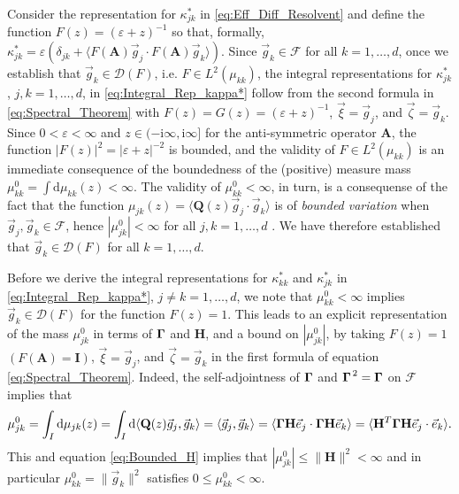 \documentclass[11pt]{amsart}
\newcommand{\I}{\mathrm{i}}
\renewcommand{\d}{\mathrm{d}}
\newcommand{\Hb}{\mathbf{H}}
\newcommand{\Ib}{\mathbf{I}}
\newcommand{\Ab}{\mathbf{A}}
\newcommand{\Qb}{\mathbf{Q}}
\newcommand{\Ds}{\mathscr{D}}
\newcommand{\Fs}{\mathscr{F}}
\newcommand\bGamma{\mbox{\boldmath${\Gamma}$}}
\begin{document}
Consider the representation for $\kappa^*_{jk}$ in
\eqref{eq:Eff_Diff_Resolvent} and define the function
$F(z)=(\varepsilon+z)^{-1}$ so that, formally,
$\kappa^*_{jk}=\varepsilon(\delta_{jk}+\langle F(\Ab)\vec{g}_j\cdot F(\Ab)\vec{g}_k\rangle)$. Since
$\vec{g}_k\in\Fs$ for all $k=1,\ldots,d$, once we establish that
$\vec{g}_k\in\Ds(F)$, i.e. $F\in L^2(\mu_{kk})$, the integral representations
for $\kappa^*_{jk}$, $j,k=1,\ldots,d$, in \eqref{eq:Integral_Rep_kappa*} follow
from the second formula in \eqref{eq:Spectral_Theorem} with
$F(z)=G(z)=(\varepsilon+z)^{-1}$, $\vec{\xi}=\vec{g}_j$, and
$\vec{\zeta}=\vec{g}_k$. Since $0<\varepsilon<\infty$ and 
$z\in(-\I\infty,\I\infty]$ for the anti-symmetric operator $\Ab$, the function
$|F(z)|^2=|\varepsilon+z|^{-2}$ is bounded, and the validity of $F\in L^2(\mu_{kk})$ is
an immediate consequence of the boundedness of the (positive) measure
mass $\mu^0_{kk}=\int\d\mu_{kk}(z)<\infty$. The validity of $\mu^0_{kk}<\infty$, in turn,
is a consequense of the fact that the function
$\mu_{jk}(z)=\langle\Qb(z)\vec{g}_j\cdot\vec{g}_k\rangle$ is of \emph{bounded
  variation} when $\vec{g}_j,\vec{g}_k\in\Fs$, hence
$|\mu^0_{jk}|<\infty$ for all $j,k=1,\ldots,d$ \cite{Stone:64}. We have therefore
established that $\vec{g}_k\in\Ds(F)$ for all $k=1,\ldots,d$.     




Before we derive the integral representations for $\kappa^*_{kk}$ and
$\kappa^*_{jk}$ in \eqref{eq:Integral_Rep_kappa*}, $j\neq k=1,\ldots,d$,  we note
that $\mu^0_{kk}<\infty$ implies $\vec{g}_k\in\Ds(F)$ for the function
$F(z)=1$. This leads to an explicit representation of the mass
$\mu^0_{jk}$ in terms of $\bGamma$ and $\Hb$, and a bound on $|\mu^0_{jk}|$,
by taking $F(z)=1$ $(F(\Ab)=\Ib)$, $\vec{\xi}=\vec{g}_j$, 
and $\vec{\zeta}=\vec{g}_k$ in the first formula of equation
\eqref{eq:Spectral_Theorem}. Indeed, the self-adjointness of $\bGamma$
and $\bGamma^{\,2}=\bGamma$ on $\Fs$ implies that   
%
\begin{align}\label{eq:Mass}
  \mu^0_{jk}=\int_I\d\mu_{jk}(z)
        =\int_I\d\langle\Qb(z)\vec{g}_j,\vec{g}_k\rangle
        =\langle\vec{g}_j,\vec{g}_k\rangle
        =\langle\bGamma\Hb\vec{e}_j\cdot\bGamma\Hb\vec{e}_k\rangle 
        =\langle\Hb^T\bGamma\Hb\vec{e}_j\cdot\vec{e}_k\rangle.     
\end{align}
%
This and equation \eqref{eq:Bounded_H} implies that
$|\mu^0_{jk}|\leq\|\Hb\|^2<\infty$ and in particular $\mu^0_{kk}=\|\vec{g}_k\|^2$
satisfies $0\leq\mu^0_{kk}<\infty$.  
\end{document}
